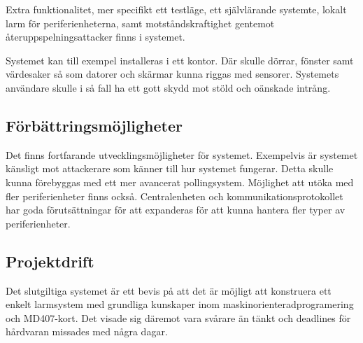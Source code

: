 \documentclass[a4paper]{article}
\begin{document}
Extra funktionalitet, mer specifikt ett testläge, ett självlärande systemte, lokalt larm för periferienheterna, samt motståndskraftighet gentemot återuppspelningsattacker finns i systemet.

Systemet kan till exempel installeras i ett kontor.
Där skulle dörrar, fönster samt värdesaker så som datorer och skärmar kunna riggas med sensorer.
Systemets användare skulle i så fall ha ett gott skydd mot stöld och oänskade intrång.

\subsection{Förbättringsmöjligheter}
Det finns fortfarande utvecklingsmöjligheter för systemet.
Exempelvis är systemet känsligt mot attackerare som känner till hur systemet fungerar.
Detta skulle kunna förebyggas med ett mer avancerat pollingsystem.
Möjlighet att utöka med fler periferienheter finns också.
Centralenheten och kommunikationsprotokollet har goda förutsättningar för att expanderas för att kunna hantera fler typer av periferienheter.

\subsection{Projektdrift}
Det slutgiltiga systemet är ett bevis på att det är möjligt att konstruera ett enkelt larmsystem med grundliga kunskaper inom maskinorienteradprogramering och MD407-kort.
Det visade sig däremot vara svårare än tänkt och deadlines för hårdvaran missades med några dagar.





\end{document}
